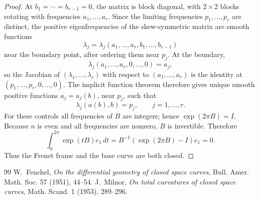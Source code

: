 \documentclass[10pt,a4paper]{amsart}
\begin{document}
\begin{proof}
At $b_1=\cdots=b_{r-1}=0$, the matrix is block diagonal, with $2\times2$ blocks
rotating with frequencies $a_1,\ldots,a_r$.  Since the limiting frequencies
$p_1,\ldots,p_r$ are distinct, the positive eigenfrequencies of the skew-symmetric
matrix are smooth functions
\[
        \lambda_j=\lambda_j(a_1,\ldots,a_r,b_1,\ldots,b_{r-1})
\]
near the boundary point, after ordering them near $p_j$.  At the boundary,
\[
        \lambda_j(a_1,\ldots,a_r,0,\ldots,0)=a_j,
\]
so the Jacobian of $(\lambda_1,\ldots,\lambda_r)$ with respect to
$(a_1,\ldots,a_r)$ is the identity at $(p_1,\ldots,p_r,0,\ldots,0)$.  The implicit
function theorem therefore gives unique smooth positive functions $a_j=a_j(b)$,
near $p_j$, such that
\[
        \lambda_j(a(b),b)=p_j,
        \qquad j=1,\ldots,r.
\]
For these controls all frequencies of $B$ are integers; hence $\exp(2\pi B)=I$.
Because $n$ is even and all frequencies are nonzero, $B$ is invertible.  Therefore
\[
        \int_0^{2\pi}\exp(tB)e_1\,dt
        =B^{-1}(\exp(2\pi B)-I)e_1=0.
\]
Thus the Frenet frame and the base curve are both closed.
\end{proof}


\begin{thebibliography}{99}
 W.~Fenchel, \emph{On the differential geometry of closed space curves}, Bull. Amer. Math. Soc. 57 (1951), 44--54.
 J.~Milnor, \emph{On total curvatures of closed space curves}, Math. Scand. 1 (1953), 289--296.
\end{thebibliography}
\end{document}
